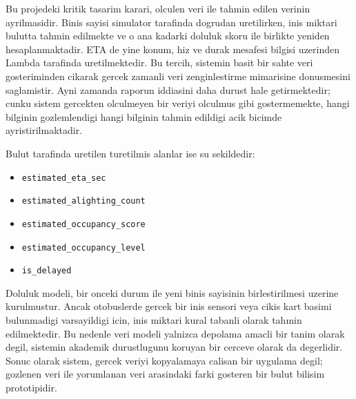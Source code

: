 Bu projedeki kritik tasarim karari, olculen veri ile tahmin edilen verinin ayrilmasidir. Binis sayisi simulator tarafinda dogrudan uretilirken, inis miktari bulutta tahmin edilmekte ve o ana kadarki doluluk skoru ile birlikte yeniden hesaplanmaktadir. ETA de yine konum, hiz ve durak mesafesi bilgisi uzerinden Lambda tarafinda uretilmektedir. Bu tercih, sistemin basit bir sahte veri gosteriminden cikarak gercek zamanli veri zenginlestirme mimarisine donusmesini saglamistir. Ayni zamanda raporun iddiasini daha durust hale getirmektedir; cunku sistem gercekten olculmeyen bir veriyi olculmus gibi gostermemekte, hangi bilginin gozlemlendigi hangi bilginin tahmin edildigi acik bicimde ayristirilmaktadir.

Bulut tarafinda uretilen turetilmis alanlar ise su sekildedir:

\begin{itemize}[leftmargin=*]
    \item \texttt{estimated\_eta\_sec}
    \item \texttt{estimated\_alighting\_count}
    \item \texttt{estimated\_occupancy\_score}
    \item \texttt{estimated\_occupancy\_level}
    \item \texttt{is\_delayed}
\end{itemize}

Doluluk modeli, bir onceki durum ile yeni binis sayisinin birlestirilmesi uzerine kurulmustur. Ancak otobuslerde gercek bir inis sensori veya cikis kart basimi bulunmadigi varsayildigi icin, inis miktari kural tabanli olarak tahmin edilmektedir. Bu nedenle veri modeli yalnizca depolama amacli bir tanim olarak degil, sistemin akademik durustlugunu koruyan bir cerceve olarak da degerlidir. Sonuc olarak sistem, gercek veriyi kopyalamaya calisan bir uygulama degil; gozlenen veri ile yorumlanan veri arasindaki farki gosteren bir bulut bilisim prototipidir.
